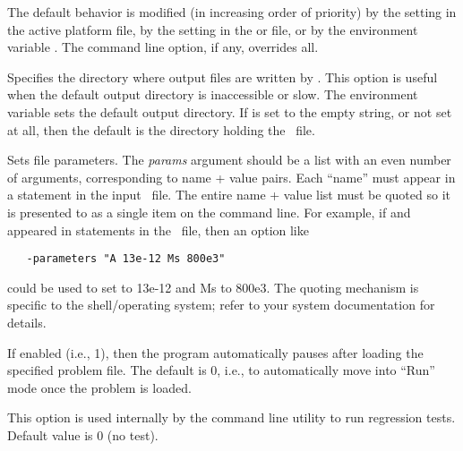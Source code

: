 \begin{description}
  The default behavior is modified (in increasing order of priority) by the
   setting in the active  platform
  file, by the  setting in the 
  or  file, or by the environment variable
  .  The
   command line option, if any, overrides all.
\item[\optkey{-outdir dir}]
  Specifies the directory where output files are written by
  .  This option is useful when the default output
  directory is inaccessible or slow. The environment variable
   sets the
  default output directory.  If  is set to the empty
  string, or not set at all, then the default is the directory holding
  the \MIF\ file.
\item[\optkey{-parameters params}]
  Sets  file
  parameters.  The \textit{params} argument should be a list with an
  even number of arguments, corresponding to name + value pairs.  Each
  ``name'' must appear in a
  statement in the input
  \MIF\ file.  The entire name + value list must be quoted so it is
  presented to  as a single item on the command line.  For
  example, if  and  appeared in  statements
  in the \MIF\ file, then an option like
\begin{verbatim}
   -parameters "A 13e-12 Ms 800e3"
\end{verbatim}
  could be used to set  to 13e-12 and Ms to 800e3.  The quoting
  mechanism is specific to the shell/operating system; refer to your system
  documentation for details.
\item[\optkey{-pause \boa 0\pipe 1\bca}]
  If enabled (i.e., 1), then the program automatically pauses after
  loading the specified problem file.  The default is 0, i.e., to
  automatically move into ``Run'' mode once the problem is loaded.
\item[\optkey{-regression\_test flag}]
  This option is used internally by the 
  command line utility to run regression tests.  Default value is 0 (no
  test).
\item[\optkey{-regression\_testname basename}]

\end{description}
